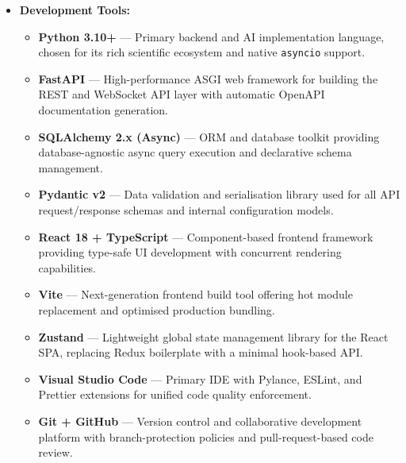 \begin{itemize}

    \item \textbf{Development Tools:}
    \begin{itemize}
        \item \textbf{Python 3.10+} — Primary backend and AI implementation language, chosen for its rich scientific ecosystem and native \texttt{asyncio} support.
        \item \textbf{FastAPI} — High-performance ASGI web framework for building the REST and WebSocket API layer with automatic OpenAPI documentation generation.
        \item \textbf{SQLAlchemy 2.x (Async)} — ORM and database toolkit providing database-agnostic async query execution and declarative schema management.
        \item \textbf{Pydantic v2} — Data validation and serialisation library used for all API request/response schemas and internal configuration models.
        \item \textbf{React 18 + TypeScript} — Component-based frontend framework providing type-safe UI development with concurrent rendering capabilities.
        \item \textbf{Vite} — Next-generation frontend build tool offering hot module replacement and optimised production bundling.
        \item \textbf{Zustand} — Lightweight global state management library for the React SPA, replacing Redux boilerplate with a minimal hook-based API.
        \item \textbf{Visual Studio Code} — Primary IDE with Pylance, ESLint, and Prettier extensions for unified code quality enforcement.
        \item \textbf{Git + GitHub} — Version control and collaborative development platform with branch-protection policies and pull-request-based code review.
    \end{itemize}


\end{itemize}
